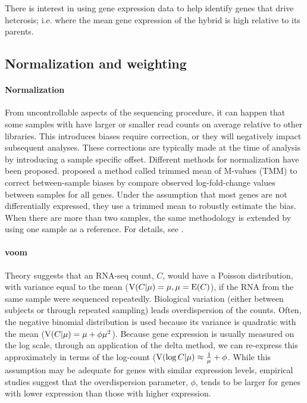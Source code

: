 There is interest in using gene expression data to help identify genes that drive heterosis; i.e. where the mean gene expression of the hybrid is high relative to its parents.

\subsection{Normalization and weighting}
\paragraph{Normalization}
From uncontrollable aspects of the sequencing procedure, it can happen that some samples with have larger or smaller read counts on average relative to other libraries. This introduces biases require correction, or they will negatively impact subsequent analyses. These corrections are typically made at the time of analysis by introducing a sample specific offset. Different methods for normalization have been proposed. \citet{robinson2010} proposed a method called trimmed mean of M-values (TMM) to correct between-sample biases by compare observed log-fold-change values between samples for all genes. Under the assumption that most genes are not differentially expressed, they use a trimmed mean to robustly estimate the bias. When there are more than two samples, the same methodology is extended by using one sample as a reference. For details, see \citet{robinson2010}.

\paragraph{voom}
Theory suggests that an RNA-seq count, $C$, would have a Poisson distribution, with variance equal to the mean ($\operatorname{V}(C|\mu)=\mu, \mu=\operatorname{E}(C)$), if the RNA from the same sample were sequenced repeatedly. Biological variation (either between subjects or through repeated sampling) leads overdispersion of the counts. Often, the negative binomial distribution is used because its variance is quadratic with the mean ($\operatorname{V}(C|\mu)=\mu+\phi\mu^2$). Because gene expression is usually measured on the log scale, through an application of the delta method, we can re-express this approximately in terms of the log-count ($\operatorname{V}(\log C|\mu) \approx \frac{1}{\mu} + \phi$. While this assumption may be adequate for genes with similar expression levels, empirical studies suggest that the overdispersion parameter, $\phi$, tends to be larger for genes with lower expression than those with higher expression.

